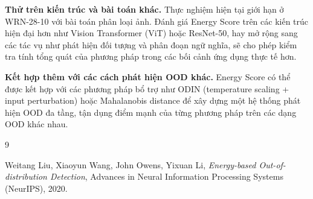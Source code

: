 \documentclass[12pt,a4paper]{article}
\begin{document}
\textbf{Thử trên kiến trúc và bài toán khác.}
Thực nghiệm hiện tại giới hạn ở WRN-28-10 với bài toán phân loại ảnh.
Đánh giá Energy Score trên các kiến trúc hiện đại hơn như Vision Transformer
(ViT) hoặc ResNet-50, hay mở rộng sang các tác vụ như phát hiện đối tượng
và phân đoạn ngữ nghĩa, sẽ cho phép kiểm tra tính tổng quát của phương pháp
trong các bối cảnh ứng dụng thực tế hơn.

\textbf{Kết hợp thêm với các cách phát hiện OOD khác.}
Energy Score có thể được kết hợp với các phương pháp bổ trợ như ODIN
(temperature scaling + input perturbation) hoặc Mahalanobis distance để
xây dựng một hệ thống phát hiện OOD đa tầng, tận dụng điểm mạnh của
từng phương pháp trên các dạng OOD khác nhau.

\newpage
\begin{thebibliography}{9}

Weitang Liu, Xiaoyun Wang, John Owens, Yixuan Li,
\textit{Energy-based Out-of-distribution Detection},
Advances in Neural Information Processing Systems (NeurIPS), 2020.

\end{thebibliography}
\end{document}
